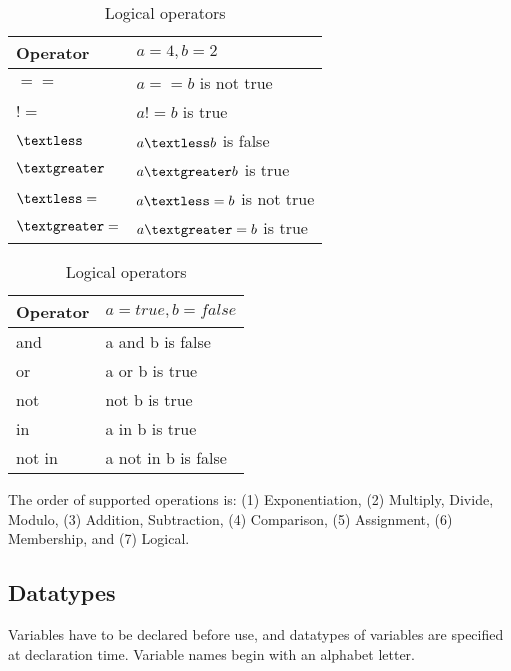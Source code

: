\begin{table}[h]
\begin{center}
    \parbox{.4\linewidth}{
        \begin{tabular}{| l | l |}
        \hline
        Operator & $a=4, b=2$ \\ \hline
        $==$ & $a == b$ is not true \\ \hline
        $!=$ & $a != b$ is true \\ \hline
        $\textless$  & $a \textless b$ is false \\ \hline
        $\textgreater$  & $a \textgreater b$ is true \\ \hline
        $\textless=$ & $a \textless= b$ is not true \\ \hline
        $\textgreater=$ & $a \textgreater= b$ is true \\ \hline
        \end{tabular}
        \caption{Comparison operators.}
    }
    \parbox{.4\linewidth}{
        \begin{tabular}{| l | l |}
        \hline
        Operator & $a = true, b = false$ \\ \hline
        and & a and b is false \\ \hline
        or & a or b is true\\ \hline
        not & not b is true \\ \hline
        in & a in b is true \\ \hline
        not in & a not in b is false\\ \hline
        \end{tabular}
        \caption{Logical operators}
     }
\end{center}
\end{table}

The order of supported operations
is: (1) Exponentiation, (2) Multiply, Divide, Modulo, (3) Addition, Subtraction,
(4) Comparison, (5) Assignment, (6) Membership, and (7) Logical.

\subsection*{Datatypes}
Variables have to be declared before use, and datatypes of
variables are specified at declaration time. Variable names 
begin with an alphabet letter.

